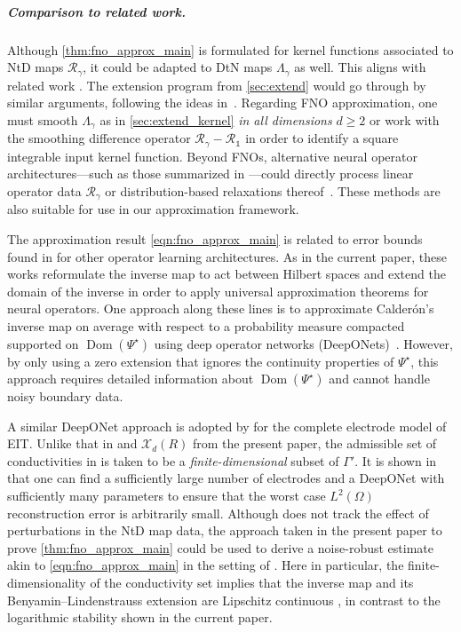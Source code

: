 \documentclass[pdflatex,sn-mathphys-num]{sn-jnl-preprint}
\newcommand{\cX}{\mathcal{X}}
\newcommand{\sR}{\mathscr{R}}
\newcommand{\dtn}{\Lambda_{\gamma}}
\newcommand{\ntd}{\mathscr{R}_{\gamma}}
\DeclareMathOperator{\domain}{Dom} %
\newcommand{\onebm}{\mathds{1}} %
\theoremstyle{thmstyleone}%
\theoremstyle{thmstyletwo}%
\theoremstyle{thmstylethree}%
\numberwithin{equation}{section}
\numberwithin{theorem}{section}
\begin{document}
\subparagraph*{\emph{\textbf{Comparison to related work.}}}
Although \cref{thm:fno_approx_main} is formulated for kernel functions associated to NtD maps $\ntd$, it could be adapted to DtN maps $\dtn$ as well. This aligns with related work \cite{castro2024calderon,abhishek2024solving}. The extension program from \cref{sec:extend} would go through by similar arguments, following the ideas in~\cite{abraham2019statistical}. Regarding FNO approximation, one must smooth $\dtn$ as in \cref{sec:extend_kernel} \emph{in all dimensions} $d\geq 2$ or work with the smoothing difference operator $\ntd-\sR_{\onebm}$ in order to identify a square integrable input kernel function. Beyond FNOs, alternative neural operator architectures---such as those summarized in \cite[Sec.~4.2]{nelsen2025operator}---could directly process linear operator data $\ntd$ \cite{de2019deep,castro2024calderon} or distribution-based relaxations thereof~\cite{guerra2025learning,molinaro2023neural}. These methods are also suitable for use in our approximation framework.

The approximation result \eqref{eqn:fno_approx_main} is related to error bounds found in \cite{abhishek2024solving,castro2024calderon,pineda2023deep} for other operator learning architectures. As in the current paper, these works reformulate the inverse map to act between Hilbert spaces and extend the domain of the inverse in order to apply universal approximation theorems for neural operators. One approach along these lines is to approximate Calder\'on's inverse map on average with respect to a probability measure compacted supported on $\domain(\Psi^\star)$ using deep operator networks (DeepONets)~\cite[Thm.~4.4, p.~786]{castro2024calderon}. However, by only using a zero extension that ignores the continuity properties of $\Psi^\star$, this approach requires detailed information about $\domain(\Psi^\star)$ and cannot handle noisy boundary data.

A similar DeepONet approach is adopted by \cite{abhishek2024solving} for the complete electrode model of EIT. Unlike that in \cite{castro2024calderon} and $\cX_d(R)$ from the present paper, the admissible set of conductivities in \cite{abhishek2024solving} is taken to be a \emph{finite-dimensional} subset of $\Gamma'$. It is shown in \cite[Thm.~3.1, p.~7]{abhishek2024solving} that one can find a sufficiently large number of electrodes and a DeepONet with sufficiently many parameters to ensure that the worst case $L^2(\Omega)$ reconstruction error is arbitrarily small. Although \cite[Thm.~3.1, p.~7]{abhishek2024solving} does not track the effect of perturbations in the NtD map data, the approach taken in the present paper to prove \cref{thm:fno_approx_main} could be used to derive a noise-robust estimate akin to \eqref{eqn:fno_approx_main} in the setting of \cite{abhishek2024solving}. Here in particular, the finite-dimensionality of the conductivity set implies that the inverse map and its Benyamin--Lindenstrauss extension are Lipschitz continuous \cite{alberti2019calderon,alberti2022infinite,harrach2019uniqueness}, in contrast to the logarithmic stability shown in the current paper.
\end{document}
